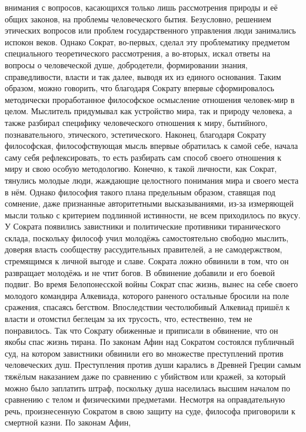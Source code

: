 внимания с вопросов, касающихся только лишь рассмотрения природы и её общих
законов, на проблемы человеческого бытия. Безусловно, решением этических
вопросов или проблем государственного управления люди занимались испокон веков.
Однако Сократ, во-первых, сделал эту проблематику предметом специального
теоретического рассмотрения, а во-вторых, искал ответы на вопросы о человеческой
душе, добродетели, формировании знания, справедливости, власти и так далее,
выводя их из единого основания. Таким образом, можно говорить, что благодаря
Сократу впервые сформировалось методически проработанное философское осмысление
отношения человек-мир в целом. Мыслитель придумывал как устройство мира, так и
природу человека, а также разбирал специфику человеческого отношения к миру,
бытийного, познавательного, этического, эстетического. Наконец, благодаря
Сократу философская, философствующая мысль впервые обратилась к самой себе,
начала саму себя рефлексировать, то есть разбирать сам способ своего отношения к
миру и свою особую методологию. Конечно, к такой личности, как Сократ, тянулись
молодые люди, жаждающие целостного понимания мира и своего места в нём. Однако
философия такого плана предельным образом, ставящая под сомнение, даже
признанные авторитетными высказываниями, из-за измеряющей мысли только с
критерием подлинной истинности, не всем приходилось по вкусу. У Сократа
появились завистники и политические противники тиранического склада, поскольку
философ учил молодёжь самостоятельно свободно мыслить, доверяя власть сообществу
рассудительных правителей, а не самодержством, стремящимся к личной выгоде и
славе. Сократа ложно обвинили в том, что он развращает молодёжь и не чтит богов.
В обвинение добавили и его боевой подвиг. Во время Белопонесской войны Сократ
спас жизнь, вынес на себе своего молодого командира Алкевиада, которого раненого
остальные бросили на поле сражения, спасаясь бегством. Впоследствии честолюбивый
Алкевиад пришёл к власти и отомстил беглецам за их трусость, что, естественно,
тем не понравилось. Так что Сократу обиженные и приписали в обвинение, что он
якобы спас жизнь тирана. По законам Афин над Сократом состоялся публичный суд,
на котором завистники обвинили его во множестве преступлений против человеческих
душ. Преступления против души карались в Древней Греции самым тяжёлым наказанием
даже по сравнению с убийством или кражей, за который можно было заплатить штраф,
поскольку душа населилась высшим началом по сравнению с телом и физическими
предметами. Несмотря на оправдательную речь, произнесенную Сократом в свою
защиту на суде, философа приговорили к смертной казни. По законам Афин,
